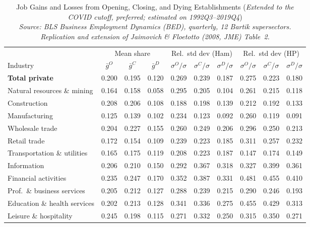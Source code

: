 \begin{table}[htbp]
\centering
\small
\caption{Job Gains and Losses from Opening, Closing, and Dying Establishments (\emph{Extended to the COVID cutoff, preferred; estimated on 1992Q3--2019Q4}) \\[2pt]
  {\small\itshape Source: BLS Business Employment Dynamics (BED), quarterly, 12 Bartik supersectors. Replication and extension of Jaimovich \& Floetotto (2008, JME) Table~2.}}
\label{tab:jf_t2_ext_2019}
\begin{tabular}{lccccccccc}
\toprule
 & \multicolumn{3}{c}{Mean share} & \multicolumn{3}{c}{Rel.\ std dev (Ham)} & \multicolumn{3}{c}{Rel.\ std dev (HP)} \\
\cmidrule(lr){2-4}\cmidrule(lr){5-7}\cmidrule(lr){8-10}
Industry & $\bar{g}^O$ & $\bar{g}^C$ & $\bar{g}^D$ & $\sigma^O/\sigma$ & $\sigma^C/\sigma$ & $\sigma^D/\sigma$ & $\sigma^O/\sigma$ & $\sigma^C/\sigma$ & $\sigma^D/\sigma$ \\
\midrule
\midrule
\textbf{Total private} & 0.200 & 0.195 & 0.120 & 0.269 & 0.239 & 0.187 & 0.275 & 0.223 & 0.180 \\
Natural resources \& mining & 0.164 & 0.158 & 0.058 & 0.295 & 0.205 & 0.104 & 0.261 & 0.215 & 0.118 \\
Construction & 0.208 & 0.206 & 0.108 & 0.188 & 0.198 & 0.139 & 0.212 & 0.192 & 0.133 \\
Manufacturing & 0.125 & 0.139 & 0.102 & 0.234 & 0.123 & 0.092 & 0.260 & 0.119 & 0.091 \\
Wholesale trade & 0.204 & 0.227 & 0.155 & 0.260 & 0.249 & 0.206 & 0.296 & 0.250 & 0.213 \\
Retail trade & 0.172 & 0.154 & 0.109 & 0.239 & 0.223 & 0.185 & 0.311 & 0.257 & 0.232 \\
Transportation \& utilities & 0.165 & 0.175 & 0.119 & 0.208 & 0.223 & 0.187 & 0.147 & 0.174 & 0.149 \\
Information & 0.206 & 0.210 & 0.150 & 0.292 & 0.367 & 0.318 & 0.327 & 0.399 & 0.361 \\
Financial activities & 0.235 & 0.247 & 0.170 & 0.352 & 0.387 & 0.331 & 0.481 & 0.455 & 0.410 \\
Prof.~\& business services & 0.205 & 0.212 & 0.127 & 0.288 & 0.239 & 0.215 & 0.290 & 0.246 & 0.193 \\
Education \& health services & 0.202 & 0.213 & 0.128 & 0.341 & 0.336 & 0.275 & 0.455 & 0.429 & 0.313 \\
Leisure \& hospitality & 0.245 & 0.198 & 0.115 & 0.271 & 0.332 & 0.250 & 0.315 & 0.350 & 0.271 \\

\end{tabular}
\end{table}
